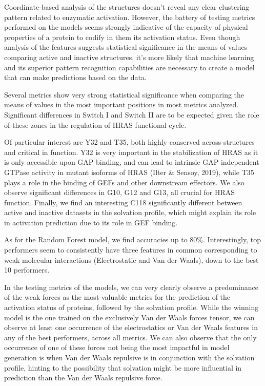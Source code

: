 \documentclass{article}
\begin{document}
Coordinate-based analysis of the structures doesn’t reveal any clear clustering pattern related to enzymatic activation. However, the battery of testing metrics performed on the models seems strongly indicative of the capacity of physical properties of a protein to codify in them its activation status. Even though analysis of the features suggests statistical significance in the means of values comparing active and inactive structures, it’s more likely that machine learning and its superior pattern recognition capabilities are necessary to create a model that can make predictions based on the data.

Several metrics show very strong statistical significance when comparing the means of values in the most important positions in most metrics analyzed. Significant differences in Switch I and Switch II are to be expected given the role of these zones in the regulation of HRAS functional cycle. 

Of particular interest are Y32 and T35, both highly conserved across structures and critical in function. Y32 is very important in the stabilization of HRAS as it is only accessible upon GAP binding, and can lead to intrinsic GAP independent GTPase activity in mutant isoforms of HRAS (Ilter \& Sensoy, 2019), while T35 plays a role in the binding of GEFs and other downstream effectors. We also observe significant differences in G10, G12 and G13, all crucial for HRAS function. Finally, we find an interesting C118 significantly different between active and inactive datasets in the solvation profile, which might explain its role in activation prediction due to its role in GEF binding.

As for the Random Forest model, we find accuracies up to 80\%. Interestingly, top performers seem to consistently have three features in common corresponding to weak molecular interactions (Electrostatic and Van der Waals), down to the best 10 performers.

In the testing metrics of the models, we can very clearly observe a predominance of the weak forces as the most valuable metrics for the prediction of the activation status of proteins, followed by the solvation profile. While the winning model is the one trained on the exclusively Van der Waals forces tensor, we can observe at least one occurrence of the electrostatics or Van der Waals features in any of the best performers, across all metrics. We can also observe that the only occurrence of one of these forces not being the most impactful in model generation is when Van der Waals repulsive is in conjunction with the solvation profile, hinting to the possibility that solvation might be more influential in prediction than the Van der Waals repulsive force.
\end{document}
